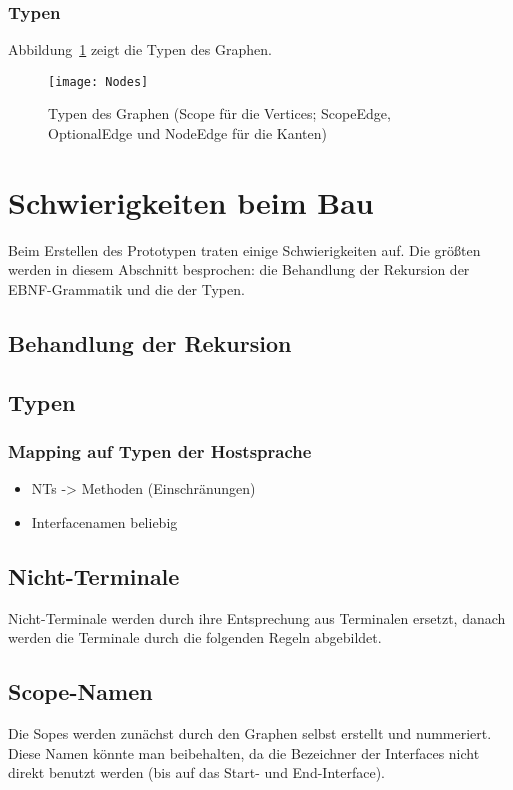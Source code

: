 \documentclass[../InterneDSLs.tex]{subfiles}
\begin{document}
\subsubsection{Typen}
Abbildung~\ref{FIG:GraphTypes} zeigt die Typen des Graphen.
\begin{figure}[ht]
\centering
\texttt{[image: Nodes]}
\caption{Typen des Graphen (Scope für die Vertices; ScopeEdge, OptionalEdge und NodeEdge für die Kanten)}
\label{FIG:GraphTypes}
\end{figure}


\section{Schwierigkeiten beim Bau}
Beim Erstellen des Prototypen traten einige Schwierigkeiten auf. Die größten werden in diesem Abschnitt besprochen: die Behandlung der Rekursion der EBNF-Grammatik und die der Typen.

\subsection{Behandlung der Rekursion}

\subsection{Typen}

\subsubsection{Mapping auf Typen der Hostsprache}
\begin{itemize}
	\item NTs -> Methoden (Einschränungen)
	\item Interfacenamen beliebig
\end{itemize}

\subsection{Nicht-Terminale}
Nicht-Terminale werden durch ihre Entsprechung aus Terminalen ersetzt, danach werden die Terminale durch die folgenden Regeln abgebildet.

\subsection{Scope-Namen}
Die Sopes werden zunächst durch den Graphen selbst erstellt und nummeriert. Diese Namen könnte man beibehalten, da die Bezeichner der Interfaces nicht direkt benutzt werden (bis auf das Start- und End-Interface).
\end{document}
